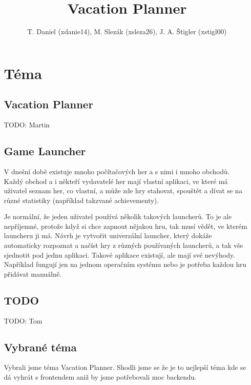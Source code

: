 \documentclass{article}
\title{Vacation Planner}
\author{
    T. Daniel (xdanie14),
    M. Slezák (xsleza26),
    J. A. Štigler (xstigl00)
}
\begin{document}
\maketitle

\newpage

\section{Téma}

\subsection{Vacation Planner}
TODO: Martin

\subsection{Game Launcher}
V dnešní době existuje mnoho počítačových her a s nimi i mnoho obchodů.
Každý obchod a i někteří vydavatelé her mají vlastní aplikaci, ve které má
uživatel seznam her, co vlastní, a může zde hry stahovat, spouštět a dívat se
na různé statistiky (například takzvané achievementy).

Je normální, že jeden uživatel používá několik takových launcherů. To je ale
nepříjemné, protože když si chce zapnout nějakou hru, tak musí vědět, ve kterém
launcheru ji má. Návrh je vytvořit univerzální launcher, který dokáže
automaticky rozpoznat a načíst hry z různých používaných launcherů, a tak vše
sjednotit pod jednu aplikaci. Takové aplikace existují, ale mají své nevýhody.
Například fungují jen na jednom operačním systému nebo je potřeba každou hru
přidávat manuálně.

\subsection{TODO}
TODO: Tom

\subsection{Vybrané téma}
Vybrali jsme téma Vacation Planner. Shodli jsme se že je to nejlepší téma kde
se dá vyhrát s frontendem aniž by jsme potřebovali moc backendu.
\end{document}
